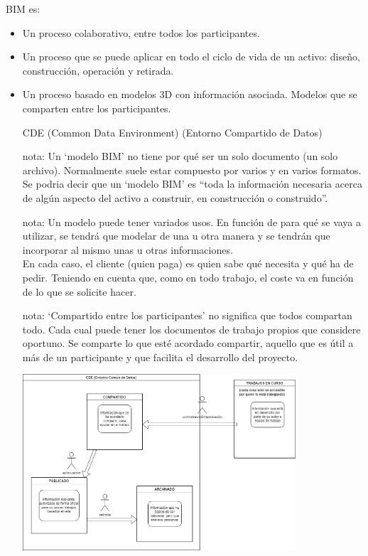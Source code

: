 \documentclass[spanish,12pt,a4paper,final,oneside]{book}
\begin{document}
BIM es:
\begin{itemize}

\item Un proceso colaborativo, entre todos los participantes.

\item Un proceso que se puede aplicar en todo el ciclo de vida de un activo: diseño, construcción, operación y retirada.

\item Un proceso basado en modelos 3D con información asociada. Modelos que se comparten entre los participantes.  

CDE (Common Data Environment) (Entorno Compartido de Datos)

\begin{small}
nota: Un `modelo BIM' no tiene por qué ser un solo documento (un solo archivo). Normalmente suele estar compuesto por varios y en varios formatos. Se podria decir que un `modelo BIM' es ``toda la información necesaria acerca de algún aspecto del activo a construir, en construcción o construido''.
\end{small}

\begin{small}
nota: Un modelo puede tener variados usos. En función de para qué se vaya a utilizar, se tendrá que modelar de una u otra manera y se tendrán que incorporar al mismo unas u otras informaciones.
\\En cada caso, el cliente (quien paga) es quien sabe qué necesita y qué ha de pedir. Teniendo en cuenta que, como en todo trabajo, el coste va en función de lo que se solicite hacer.
\end{small}

\begin{small}
nota: `Compartido entre los participantes' no significa que todos compartan todo. Cada cual puede tener los documentos de trabajo propios que considere oportuno. Se comparte lo que esté acordado compartir, aquello que es útil a más de un participante y que facilita el desarrollo del proyecto.
\end{small}
\begin{center}
\includegraphics[width=0.8\textwidth]{posibles estados de los documentos trabajando con un CDE}
\end{center}


\end{itemize}
\end{document}
